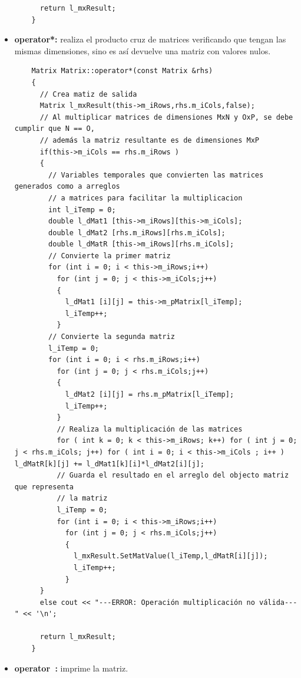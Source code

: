 \begin{itemize}
\begin{verbatim}
      return l_mxResult;
    }
    \end{verbatim}
    
    \item \textbf{operator*:} realiza el producto cruz de matrices verificando que tengan las mismas dimensiones, sino es así devuelve una matriz con valores nulos. 
    
    \begin{verbatim}
    Matrix Matrix::operator*(const Matrix &rhs)
    {
      // Crea matiz de salida
      Matrix l_mxResult(this->m_iRows,rhs.m_iCols,false);
      // Al multiplicar matrices de dimensiones MxN y OxP, se debe cumplir que N == O,
      // además la matriz resultante es de dimensiones MxP
      if(this->m_iCols == rhs.m_iRows )
      {
        // Variables temporales que convierten las matrices generados como a arreglos
        // a matrices para facilitar la multiplicacion
        int l_iTemp = 0;
        double l_dMat1 [this->m_iRows][this->m_iCols];
        double l_dMat2 [rhs.m_iRows][rhs.m_iCols];
        double l_dMatR [this->m_iRows][rhs.m_iCols];
        // Convierte la primer matriz
        for (int i = 0; i < this->m_iRows;i++)
          for (int j = 0; j < this->m_iCols;j++)
          {
            l_dMat1 [i][j] = this->m_pMatrix[l_iTemp];
            l_iTemp++;
          }
        // Convierte la segunda matriz
        l_iTemp = 0;
        for (int i = 0; i < rhs.m_iRows;i++)
          for (int j = 0; j < rhs.m_iCols;j++)
          {
            l_dMat2 [i][j] = rhs.m_pMatrix[l_iTemp];
            l_iTemp++;
          }
          // Realiza la multiplicación de las matrices
          for ( int k = 0; k < this->m_iRows; k++) for ( int j = 0; j < rhs.m_iCols; j++) for ( int i = 0; i < this->m_iCols ; i++ ) l_dMatR[k][j] += l_dMat1[k][i]*l_dMat2[i][j];
          // Guarda el resultado en el arreglo del objecto matriz que representa
          // la matriz
          l_iTemp = 0;
          for (int i = 0; i < this->m_iRows;i++)
            for (int j = 0; j < rhs.m_iCols;j++)
            {
              l_mxResult.SetMatValue(l_iTemp,l_dMatR[i][j]);
              l_iTemp++;
            }
      }
      else cout << "---ERROR: Operación multiplicación no válida---" << '\n';
    
      return l_mxResult;
    }
    \end{verbatim}

    \item \textbf{operator $~$:} imprime la matriz.
    

\end{itemize}
